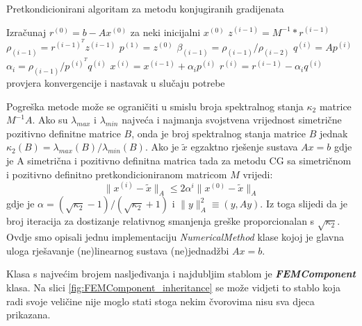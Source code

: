\documentclass[a4paper,twoside,12pt]{memoir} %
\begin{document}
\begin{algorithm}[H]
\caption{Pretkondicionirani algoritam za metodu konjugiranih gradijenata}\label{code:pseudokod}
\begin{algorithmic}[1]
\State Izračunaj $r^{(0)} = b - A x^{(0)}$ za neki inicijalni $x^{(0)}$
    \State $z^{(i - 1)} = M^{-1} * r^{(i - 1)}$
    \State $\rho_{(i - 1)} = r^{(i - 1)^T} z^{(i - 1)}$
        \State $p^{(1)} = z^{(0)}$
    \Else
        \State $\beta_{(i - 1)} = \rho_{(i - 1)}/\rho_{(i - 2)} $
    \EndIf
    \State $q^{(i)} = A p^{(i)}$
    \State $\alpha_i = \rho_{(i - 1)} / p^{(i)^T} q^{(i)}$
    \State $x^{(i)} = x^{(i - 1)} + \alpha_i p^{(i)}$
    \State $r^{(i)} = r^{(i - 1)} - \alpha_i q^{(i)}$
    \State provjera konvergencije i nastavak u slučaju potrebe
\EndFor
\end{algorithmic}
\end{algorithm}

Pogreška metode može se ograničiti u smislu broja spektralnog stanja $\kappa_2$ matrice $M^{-1}A$. Ako su $\lambda_{max}$ i $\lambda_{min}$ najveća i najmanja svojstvena vrijednost simetrične pozitivno definitne matrice $B$, onda je broj spektralnog stanja matrice $B$ jednak $\kappa_2(B) = \lambda_{max}(B) / \lambda_{min}(B)$. Ako je $\tilde{x}$ egzaktno rješenje sustava $Ax = b$ gdje je A simetrična i pozitivno definitna matrica tada za metodu CG sa simetričnom i pozitivno definitno pretkondicioniranom matricom $M$ vrijedi:
\begin{equation}
    \lVert x^{(i)} - \tilde{x} \rVert_A \leqslant 2 \alpha^i \lVert x^{(0)} - \tilde{x} \rVert_A
\end{equation}
gdje je $\alpha = (\sqrt{\kappa_2} - 1) / (\sqrt{\kappa_2} + 1)$ i $\lVert y \rVert_A^2 \equiv (y, Ay)$. Iz toga slijedi da je broj iteracija za dostizanje relativnog smanjenja greške proporcionalan s $\sqrt{\kappa_2}$. Ovdje smo opisali jednu implementaciju \textit{NumericalMethod} klase kojoj je glavna uloga rješavanje (ne)linearnog sustava (ne)jednadžbi $Ax = b$. \par

Klasa s najvećim brojem nasljeđivanja i najdubljim stablom je \textbf{\textit{FEMComponent}} klasa. Na slici \ref{fig:FEMComponent_inheritance} se može vidjeti to stablo koja radi svoje veličine nije moglo stati stoga nekim čvorovima nisu sva djeca prikazana.
\end{document}
